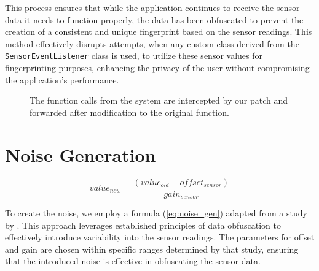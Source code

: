\documentclass[11pt,
  oneside,openany,    %
]{scrreprt}
\begin{document}
This process ensures that while the application continues to receive the sensor data it needs to function properly, the data has been obfuscated to prevent the creation of a consistent and unique fingerprint based on the sensor readings.
This method effectively disrupts attempts, when any custom class derived from the \verb|SensorEventListener| class is used, to utilize these sensor values for fingerprinting purposes, enhancing the privacy of the user without compromising the application's performance.

\begin{figure}[h]
  \centering
  \captionsetup{justification=centering}
  \caption{The function calls from the system are intercepted by our patch and forwarded after modification to the original function.}
  \label{fig:patch}
\end{figure}

\section{Noise Generation}
\label{sec:noise_gen}
\begin{equation}
  value_{new} = \frac{(value_{old} - offset_{sensor})}{gain_{sensor}}
  \label{eq:noise_gen}
\end{equation}

To create the noise, we employ a formula (\ref{eq:noise_gen}) adapted from a study by \citeauthor{DBLP:conf/ndss/DasBC16} \cite{DBLP:conf/ndss/DasBC16}.
This approach leverages established principles of data obfuscation to effectively introduce variability into the sensor readings.
The parameters for offset and gain are chosen within specific ranges determined by that study, ensuring that the introduced noise is effective in obfuscating the sensor data.
\end{document}

